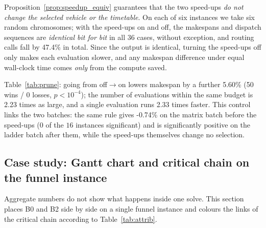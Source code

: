 \documentclass[manuscript,screen,review]{acmart}
\newcommand{\SpeedupProbe}{2.33}
\newcommand{\RouteCallCut}{47.4\%}
\newcommand{\GainPrune}{5.60\%}
\newcommand{\PPrune}{<10^{-4}}
\newcommand{\WinPrune}{50}
\newcommand{\LosePrune}{0}
\newcommand{\EvalRatioPrune}{2.23}
\newcommand{\MatrixCells}{16}
\newcommand{\GainProbePre}{-0.74\%}      %
\begin{document}
Proposition~\ref{prop:speedup_equiv} guarantees that the two speed-ups \emph{do not change the selected vehicle or the timetable}. On each of six instances we take six random chromosomes; with the speed-ups on and off, the makespans and dispatch sequences are \emph{identical bit for bit} in all $36$ cases, without exception, and routing calls fall by \RouteCallCut{} in total. Since the output is identical, turning the speed-ups off only makes each evaluation slower, and any makespan difference under equal wall-clock time comes \emph{only} from the compute saved.

Table~\ref{tab:prune}: going from off$\to$on lowers makespan by a further \GainPrune{} (\WinPrune{} wins / \LosePrune{} losses, $p\PPrune$); the number of evaluations within the same budget is \EvalRatioPrune{} times as large, and a single evaluation runs \SpeedupProbe{} times faster.
This control links the two batches: the same rule gives \GainProbePre{} on the matrix batch before the speed-ups ($0$ of the $\MatrixCells$ instances significant) and is significantly positive on the ladder batch after them, while the speed-ups themselves change no selection.

\begin{table}[t]
\caption{Changing only pruning and winner-path reuse. ``Off''/``on'' indicates whether the two are enabled; the bold header marks the setting adopted in this paper.
The two settings produce bit-identical output (verified by the equivalence self-check), so the difference comes only from the compute saved. Same instances, same seeds, same wall-clock time; $n=60$ pairs, two-sided Wilcoxon signed-rank test ($^{***}p<0.001$); the aggregate row lists wins/losses/ties and $p$.
Both ratio columns use the \emph{off} value as denominator, in opposite directions: evaluations as on/off, time per evaluation as off/on.}
\label{tab:prune}
\small

\end{table}
\subsection{Case study: Gantt chart and critical chain on the funnel instance}
\label{sec:casestudy}

Aggregate numbers do not show what happens inside one solve. This section places B0 and B2 side by side on a single funnel instance and colours the links of the critical chain according to Table~\ref{tab:attrib}.
\end{document}
